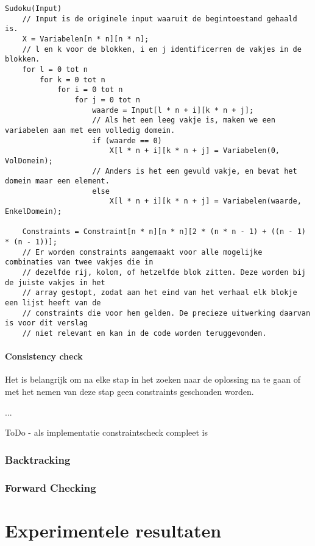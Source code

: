 \documentclass[]{report}
\begin{document}
\begin{minipage}{\textwidth}
\begin{lstlisting}
Sudoku(Input)
	// Input is de originele input waaruit de begintoestand gehaald is.
	X = Variabelen[n * n][n * n];
	// l en k voor de blokken, i en j identificerren de vakjes in de blokken.
	for l = 0 tot n
		for k = 0 tot n
			for i = 0 tot n
				for j = 0 tot n
					waarde = Input[l * n + i][k * n + j];
					// Als het een leeg vakje is, maken we een variabelen aan met een volledig domein.
					if (waarde == 0)
						X[l * n + i][k * n + j] = Variabelen(0, VolDomein);
					// Anders is het een gevuld vakje, en bevat het domein maar een element.
					else
						X[l * n + i][k * n + j] = Variabelen(waarde, EnkelDomein);
						
	Constraints = Constraint[n * n][n * n][2 * (n * n - 1) + ((n - 1) * (n - 1))];
	// Er worden constraints aangemaakt voor alle mogelijke combinaties van twee vakjes die in 
	// dezelfde rij, kolom, of hetzelfde blok zitten. Deze worden bij de juiste vakjes in het 
	// array gestopt, zodat aan het eind van het verhaal elk blokje een lijst heeft van de 
	// constraints die voor hem gelden. De precieze uitwerking daarvan is voor dit verslag 
	// niet relevant en kan in de code worden teruggevonden.
\end{lstlisting}
\end{minipage}

\subsubsection{Consistency check}
Het is belangrijk om na elke stap in het zoeken naar de oplossing na te gaan of met het nemen van deze stap geen constraints geschonden worden.

...

ToDo - als implementatie constraintscheck compleet is

\subsection{Backtracking}

\subsection{Forward Checking}

\chapter{Experimentele resultaten}
\end{document}

